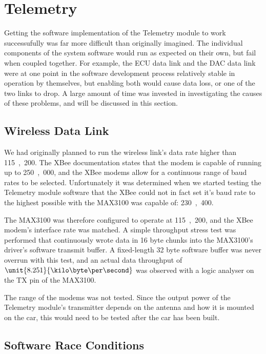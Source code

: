 \section{Telemetry}

Getting the software implementation of the Telemetry module to work successufully was far more difficult than originally imagined. The individual components of the system software would run as expected on their own, but fail when coupled together. For example, the ECU data link and the DAC data link were at one point in the software development process relatively stable in operation by themselves, but enabling both would cause data loss, or one of the two links to drop. A large amount of time was invested in investigating the causes of these problems, and will be discussed in this section.

\subsection{Wireless Data Link}

We had originally planned to run the wireless link's data rate higher than \unit{115,200}{\bit\per\second}. The XBee documentation states that the modem is capable of running up to \unit{250,000}{\bit\per\second}, and the XBee modems allow for a continuous range of baud rates to be selected. Unfortunately it was determined when we started testing the Telemetry module software that the XBee could not in fact set it's baud rate to the highest possible with the MAX3100 was capable of: \unit{230,400}{\bit\per\second}.

The MAX3100 was therefore configured to operate at \unit{115,200}{\bit\per\second}, and the XBee modem's interface rate was matched. A simple throughput stress test was performed that continuously wrote data in 16 byte chunks into the MAX3100's driver's software transmit buffer. A fixed-length 32 byte software buffer was never overrun with this test, and an actual data throughput of $\unit{8.251}{\kilo\byte\per\second}$ was observed with a logic analyser on the TX pin of the MAX3100.

The range of the modems was not tested. Since the output power of the Telemetry module's transmitter depends on the antenna and how it is mounted on the car, this would need to be tested after the car has been built.

\subsection{Software Race Conditions}

